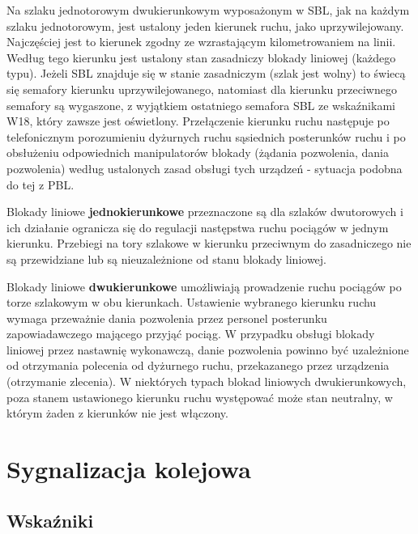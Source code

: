 Na szlaku jednotorowym dwukierunkowym wyposażonym w SBL, jak na każdym szlaku jednotorowym, jest ustalony jeden kierunek ruchu, jako uprzywilejowany. Najczęściej jest to kierunek zgodny ze wzrastającym kilometrowaniem na linii. Według tego kierunku jest ustalony stan zasadniczy blokady liniowej (każdego typu). 
Jeżeli SBL znajduje się w stanie zasadniczym (szlak jest wolny) to świecą się semafory kierunku uprzywilejowanego, natomiast dla kierunku przeciwnego semafory są wygaszone, z wyjątkiem ostatniego semafora SBL ze wskaźnikami W18, który zawsze jest oświetlony. 
Przełączenie kierunku ruchu następuje po telefonicznym porozumieniu dyżurnych ruchu sąsiednich posterunków ruchu i po obsłużeniu odpowiednich manipulatorów blokady (żądania pozwolenia, dania pozwolenia) według ustalonych zasad obsługi tych urządzeń - sytuacja podobna do tej z PBL. 

Blokady liniowe \textbf{jednokierunkowe} przeznaczone są dla szlaków dwutorowych i ich działanie ogranicza się do regulacji następstwa ruchu pociągów w jednym kierunku. Przebiegi na tory szlakowe w kierunku przeciwnym do zasadniczego nie są przewidziane lub są nieuzależnione od stanu blokady liniowej.

Blokady liniowe \textbf{dwukierunkowe} umożliwiają prowadzenie ruchu pociągów po torze szlakowym w obu kierunkach. Ustawienie wybranego kierunku ruchu wymaga przeważnie dania pozwolenia przez personel posterunku zapowiadawczego mającego przyjąć pociąg. W przypadku obsługi blokady liniowej przez nastawnię wykonawczą, danie pozwolenia powinno być uzależnione od otrzymania polecenia od dyżurnego ruchu, przekazanego przez urządzenia (otrzymanie zlecenia). W niektórych typach blokad liniowych dwukierunkowych, poza stanem ustawionego kierunku ruchu występować może stan neutralny, w którym żaden z kierunków nie jest włączony.

 


\chapter{Sygnalizacja kolejowa}

\section{Wskaźniki}

